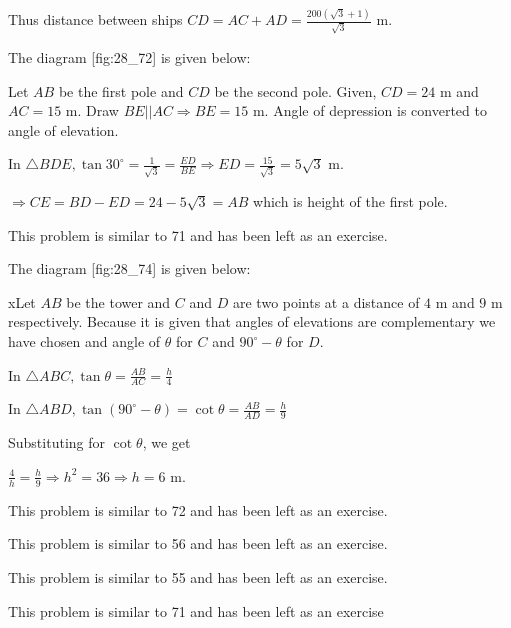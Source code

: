   Thus distance between ships $CD = AC + AD = \frac{200(\sqrt{3} + 1)}{\sqrt{3}}$ m.

\item The diagram [fig:28_72] is given below:

  \startplacefigure[reference=fig:28_72]
    \externalfigure[28_72.pdf]
  \stopplacefigure

  Let $AB$ be the first pole and $CD$ be the second pole. Given, $CD = 24$ m and $AC = 15$ m. Draw
  $BE || AC \Rightarrow BE = 15$ m. Angle of depression is converted to angle of elevation.

  In $\triangle BDE, \tan30^\circ = \frac{1}{\sqrt{3}} = \frac{ED}{BE} \Rightarrow ED = \frac{15}{\sqrt{3}} = 5\sqrt{3}$ m.

  $\Rightarrow CE = BD - ED = 24 - 5\sqrt{3} = AB$ which is height of the first pole.

\item This problem is similar to 71 and has been left as an exercise.

\item The diagram [fig:28_74] is given below:

  \startplacefigure[reference=fig:28_74]
    \externalfigure[28_74.pdf]
  \stopplacefigure

  xLet $AB$ be the tower and $C$ and $D$ are two points at a distance of $4$ m and $9$ m
  respectively. Because it is given that angles of elevations are complementary we have chosen and angle of $\theta$ for
  $C$ and $90^\circ - \theta$ for $D$.

  In $\triangle ABC, \tan\theta = \frac{AB}{AC} = \frac{h}{4}$

  In $\triangle ABD, \tan(90^\circ - \theta) = \cot\theta = \frac{AB}{AD} = \frac{h}{9}$

  Substituting for $\cot\theta$, we get

  $\frac{4}{h} = \frac{h}{9}\Rightarrow h^2 = 36 \Rightarrow h = 6$ m.

\item This problem is similar to 72 and has been left as an exercise.

\item This problem is similar to 56 and has been left as an exercise.

\item This problem is similar to 55 and has been left as an exercise.

\item This problem is similar to 71 and has been left as an exercise

